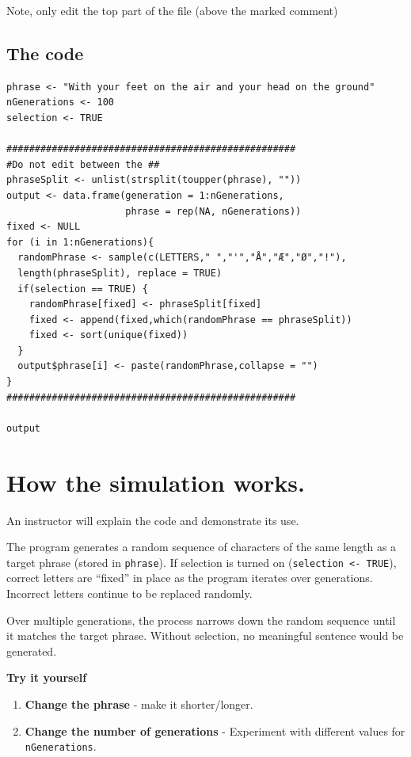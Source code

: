 \documentclass[
  a4paper]{book}
\providecommand{\tightlist}{%
  \setlength{\itemsep}{0pt}\setlength{\parskip}{0pt}}
\begin{document}
Note, only edit the top part of the file (above the marked comment)

\subsection{The code}\label{the-code}

\begin{verbatim}
phrase <- "With your feet on the air and your head on the ground"
nGenerations <- 100
selection <- TRUE

###################################################
#Do not edit between the ##
phraseSplit <- unlist(strsplit(toupper(phrase), ""))
output <- data.frame(generation = 1:nGenerations, 
                     phrase = rep(NA, nGenerations))
fixed <- NULL
for (i in 1:nGenerations){
  randomPhrase <- sample(c(LETTERS," ","'","Å","Æ","Ø","!"), 
  length(phraseSplit), replace = TRUE)
  if(selection == TRUE) {
    randomPhrase[fixed] <- phraseSplit[fixed]
    fixed <- append(fixed,which(randomPhrase == phraseSplit))
    fixed <- sort(unique(fixed))
  }
  output$phrase[i] <- paste(randomPhrase,collapse = "")
}
###################################################

output
\end{verbatim}

\section{How the simulation works.}\label{how-the-simulation-works.}

An instructor will explain the code and demonstrate its use.

The program generates a random sequence of characters of the same length as a target phrase (stored in \texttt{phrase}). If selection is turned on (\texttt{selection\ \textless{}-\ TRUE}), correct letters are ``fixed'' in place as the program iterates over generations. Incorrect letters continue to be replaced randomly.

Over multiple generations, the process narrows down the random sequence until it matches the target phrase. Without selection, no meaningful sentence would be generated.

\textbf{Try it yourself }

\begin{enumerate}
\def\labelenumi{\arabic{enumi})}
\tightlist
\item
  \textbf{Change the phrase} - make it shorter/longer.
\item
  \textbf{Change the number of generations} - Experiment with different values for \texttt{nGenerations}.
\end{enumerate}
\end{document}
